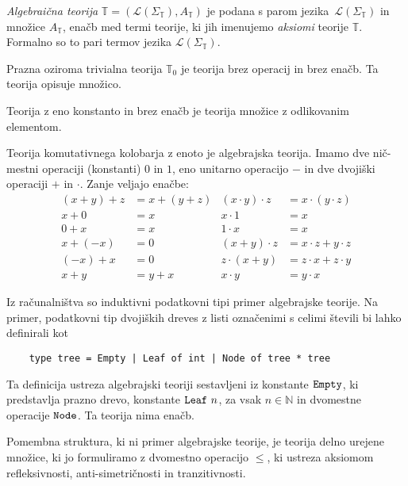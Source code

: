 \documentclass[../kategoricna_logika.tex]{subfiles}
\begin{document}
%
\begin{definicija}
  \emph{Algebraična teorija}
  $\mathbb{T} = (\mathcal{L}(\Sigma_\mathbb{T}), A_\mathbb{T})$ je podana s parom
  jezika~$\mathcal{L}(\Sigma_\mathbb{T})$ in množice $A_\mathbb{T}$, enačb med termi
  teorije, ki jih imenujemo \emph{aksiomi} teorije $\mathbb{T}$. Formalno so
  to pari termov jezika $\mathcal{L}(\Sigma_{\mathbb{T}})$.
\end{definicija}
\begin{primer}
  Prazna oziroma trivialna teorija $\mathbb{T}_0$ je teorija brez operacij in brez enačb.
  Ta teorija opisuje množico.
\end{primer}
\begin{primer}
Teorija z eno konstanto in brez enačb je teorija množice z odlikovanim elementom.
\end{primer}
\begin{primer}
  Teorija komutativnega kolobarja z enoto je algebrajska teorija.
  Imamo dve nič-mestni operaciji (konstanti) $0$ in $1$, eno unitarno operacijo
  $-$ in dve dvojiški operaciji $+$ in $\cdot$. Zanje veljajo enačbe:
\begin{align*}
  (x+y)+z &= x + (y + z) & (x \cdot y) \cdot z &= x \cdot (y \cdot z) \\
  x + 0 &= x & x \cdot 1 &= x \\
  0 + x &= x & 1\cdot x &= x \\
  x + (-x) &= 0 & (x+y)\cdot z &= x \cdot z + y\cdot z \\
  (-x) + x &= 0 & z \cdot (x+y) &= z \cdot x+ z\cdot y \\
  x + y &= y + x & x \cdot y &= y\cdot x
\end{align*}
\end{primer}
\begin{primer}
  Iz računalništva so induktivni podatkovni tipi primer algebrajske teorije.
  Na primer, podatkovni tip dvojiških dreves z listi označenimi s celimi števili
  bi lahko definirali kot
  \begin{verbatim}
    type tree = Empty | Leaf of int | Node of tree * tree
  \end{verbatim}
  Ta definicija ustreza algebrajski teoriji sestavljeni iz konstante $\verb|Empty|$,
  ki predstavlja prazno drevo, konstante $\verb|Leaf| \  n$, za vsak $n \in \mathbb{N}$
  in dvomestne operacije $\verb|Node|$. Ta teorija nima enačb. 
\end{primer}
\begin{primer}
  Pomembna struktura, ki ni primer algebrajske teorije, je teorija delno urejene množice,
  ki jo formuliramo z dvomestno operacijo $\leq$, ki ustreza aksiomom refleksivnosti,
  anti-simetričnosti in tranzitivnosti.
\end{primer}
%
%
\end{document}
